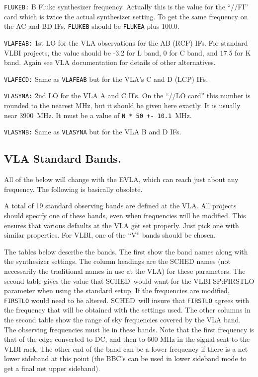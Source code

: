 \documentclass{report}
\newcommand{\schedb}{{\sc SCHED~}}
\begin{document}
\begin{list}{}{\parsep 0em  \itemsep 0em }
{\tt FLUKEB:} B Fluke synthesizer frequency.
Actually this is the value for the ``//FI'' card which is twice the
actual synthesizer setting.  To get the same frequency on the AC and
BD IFs, {\tt FLUKEB} should be {\tt FLUKEA} plus 100.0.

{\tt VLAFEAB:} 1st LO for the VLA observations
for the AB (RCP) IFs. For standard VLBI projects, the value should be
-3.2 for L band, 0 for C band, and 17.5 for K band. Again see VLA
documentation for details of other alternatives.

{\tt VLAFECD:} Same as {\tt VLAFEAB} but for
the VLA's C and D (LCP) IFs.

{\tt VLASYNA:} 2nd LO for the VLA A and C IFs.
On the ``//LO card'' this number is rounded to the nearest MHz, but it
should be given here exactly. It is usually near 3900~MHz. It must be
a value of {\tt N * 50 +- 10.1}~MHz.

\item {\tt VLASYNB:} Same as {\tt VLASYNA} but for
the VLA B and D IFs.

\end{list}

\subsection{\label{SSEC:VLASTDBD}VLA Standard Bands.}

All of the below will change with the EVLA, which can reach just about
any frequency.  The following is basically obsolete.

A total of 19 standard observing bands are defined at the VLA.  All
projects should specify one of these bands, even when frequencies will
be modified.  This ensures that various defaults at the VLA get set
properly.  Just pick one with similar properties.  For VLBI, one of the
``V'' bands should be chosen.

The tables below describe the bands.
The first show the band names along with the synthesizer settings.
The column headings are the SCHED names (not necessarily the traditional
names in use at the VLA) for these parameters.  The second table gives
the value that \schedb would want for the VLBI 
{SP:FIRSTLO} parameter when using the standard setup.  If the
frequencies are modified, {\tt FIRSTLO} would need to be altered.
\schedb will insure that {\tt FIRSTLO} agrees with the frequency
that will be obtained with the settings used.  The other columns
in the second table show the range of sky frequencies covered by
the VLA band.  The observing frequencies must lie in these bands.  Note
that the first frequency is that of the edge converted to DC, and then
to 600 MHz in the signal sent to the VLBI rack.  The other end of the
band can be a lower frequency if there is a net lower sideband at this
point (the BBC's can be used in lower sideband mode to get a final
net upper sideband).
\end{document}
